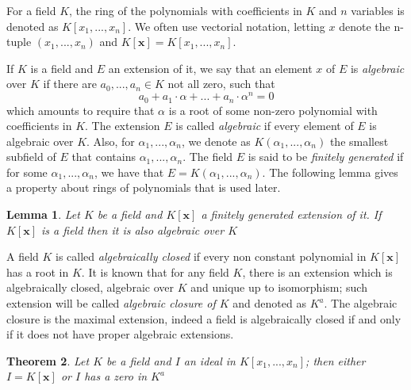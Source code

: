 \documentclass[a4paper,12pt,oneside]{book}
\newtheorem{theorem}{Theorem}[chapter]
\newtheorem{lemma}[theorem]{Lemma}
\begin{document}

For a field $K$, the ring of the polynomials with coefficients in $K$ and $n$ variables is denoted as $K[x_1,...,x_n ]$. We often use vectorial notation, letting  $x$ denote the n-tuple $(x_1,...,x_n)$ and $K[\mathbf{x}]= K[x_1,...,x_n ] $.


If $K$ is a field and $E$ an extension of it, we say that an element $x$ of $E$ is \textit{algebraic} over $K$ if there are $a_0, ..., a_n\in K$ not all zero, such that
$$ a_0 + a_1 \cdot \alpha + ...+ a_n \cdot \alpha^n=0 $$ 
which amounts to require that $\alpha$  is a root of some non-zero polynomial with coefficients in $K$. The extension $E$ is called \textit{algebraic} if every element of $E$ is algebraic over $K$. 
Also, for $\alpha_1, ...,\alpha_n $, we denote as $K(\alpha_1, ...,\alpha_n) $ the smallest subfield of $E$ that contains $\alpha_1, ...,\alpha_n$. The field $E$ is said to be \textit{finitely generated} if for some $\alpha_1, ...,\alpha_n$, we have that $E=K(\alpha_1, ...,\alpha_n)$. 
The following lemma gives a property about rings of polynomials that is used later.
\begin{lemma}\label{finit_gen}
Let $K$ be a field and $K[\mathbf{x}]$ a finitely generated extension of it. If $K[\mathbf{x}]$ is a field then it is also algebraic over $K$
\end{lemma}

A field $K$ is called \textit{algebraically closed} if every non constant polynomial in $K[\mathbf{x}]$ has a root in $K$. It is known that for any field $K$, there is an extension which is algebraically closed, algebraic over $K$ and unique up to isomorphism;  such extension will be called \textit{algebraic closure of $K$} and denoted as $K^a$. The algebraic closure is the maximal extension, indeed a field is algebraically closed if and only if it does not have proper algebraic extensions. 

\begin{theorem}\label{zeros}
Let $K$ be a field and $I$ an ideal in $K[x_1,...,x_n]$; then either $I=K[\mathbf{x}]$ or $I$ has a zero in $K^a$
\end{theorem}
\end{document}
